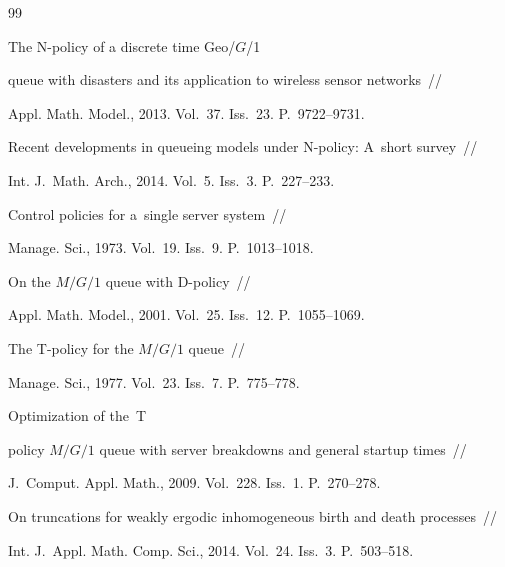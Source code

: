{{\begin{thebibliography}{99}

 The N-policy of a discrete time Geo/$G$/1 

queue with disasters and its application to wireless sensor networks~/\!\!/ 

Appl. Math. Model., 2013. Vol.~37. Iss.~23. P.~9722--9731.





Recent developments in queueing models under N-policy: A~short survey~/\!\!/ 

Int. J.~Math. Arch., 2014. Vol.~5. Iss.~3. P.~227--233.




 Control policies for a~single server system~/\!\!/

Manage. Sci., 1973. Vol.~19. Iss.~9. P.~1013--1018.




 On the $M/G/1$ queue with D-policy~/\!\!/

Appl. Math. Model., 2001. Vol.~25. Iss.~12. P.~1055--1069.




 The T-policy for the $M/G/1$ queue~/\!\!/ 

Manage. Sci., 1977. Vol.~23. Iss.~7. P.~775--778.




 Optimization of the~T

policy $M/G/1$ queue with server breakdowns and general startup times~/\!\!/ 

J.~Comput.  Appl. Math., 2009. Vol.~228. Iss.~1. P.~270--278.





On truncations for weakly ergodic inhomogeneous birth and death processes~/\!\!/

Int. J.~Appl. Math. Comp. Sci., 2014. Vol.~24. Iss.~3. P.~503--518.




\end{thebibliography}}}
